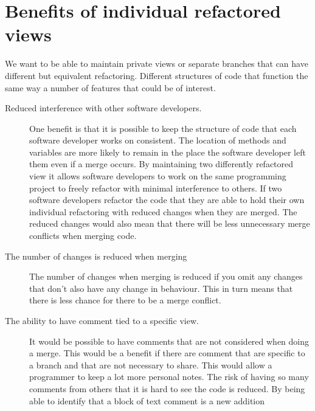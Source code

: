 \section{Benefits of individual refactored views}
We want to be able to maintain private views or separate branches that can have different but equivalent refactoring. Different structures of code that function the same way a number of features that could be of interest.

\begin{description}

  \item [Reduced interference with other software developers.]   
  One benefit is that it is possible to keep the structure of code that each software developer works on consistent.  The location of methods and variables are more likely to remain in the place the software developer left them even if a merge occurs.
  By maintaining two differently refactored view it allows software developers to work on the same programming project to freely refactor with minimal interference to others.
  If two software developers refactor the code that they are able to hold their own individual refactoring with reduced changes when they are merged.
  The reduced changes would also mean that there will be less unnecessary merge conflicts when merging code.
  
  \item [The number of changes is reduced when merging] 
  The number of changes when merging is reduced if you omit any changes that don't also have any change in behaviour.  This in turn means that there is less chance for there to be a merge conflict.
  
  \item [The ability to have comment tied to a specific view.] 
  It would be possible to have comments that are not considered when doing a merge. This would be a benefit if there are comment that are specific to a branch and that are not necessary to share.  This would allow a programmer to keep a lot more personal notes.  The risk of having so many comments from others that it is hard to see the code is reduced. By being able to identify that a block of text comment is a new addition

\end{description}

% 
% 
% 


